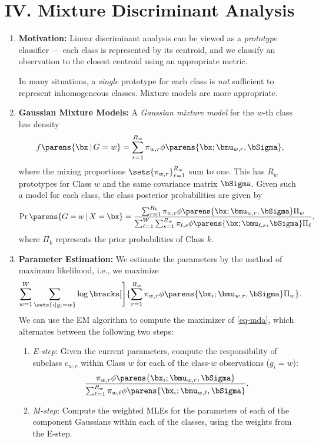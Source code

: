 \documentclass[12pt]{article}
\begin{document}
\section*{IV. Mixture Discriminant Analysis}

\begin{enumerate}[label=\textbf{\arabic*.}]

	\item \textbf{Motivation:} Linear discriminant analysis can be viewed as a \emph{prototype} classifier --- each class is represented by its centroid, and we classify an observation to the closest centroid using an appropriate metric. 
	
	In many situations, a \emph{single} prototype for each class is \emph{not} sufficient to represent inhomogeneous classes. Mixture models are more appropriate. 
	
	\item \textbf{Gaussian Mixture Models:} A \textit{Gaussian mixture model} for the $w$-th class has density 
	\begin{align*}
		f \parens{\bx \,\vert\, G = w} = \sum_{r=1}^{R_w} \pi_{w, r} \phi \parens{\bx; \bmu_{w,r}, \bSigma}, 
	\end{align*}
	where the mixing proportions $\sets{\pi_{w,r}}_{r=1}^{R_w}$ sum to one. This has $R_w$ prototypes for Class $w$ and the same covariance matrix $\bSigma$. Given such a model for each class, the class posterior probabilities are given by 
	\begin{align*}
		\Pr \parens{G = w \,\vert\, X = \bx} = \frac{\sum_{r=1}^{R_k} \pi_{w, r} \phi \parens{\bx; \bmu_{w, r}, \bSigma} \Pi_w}{\sum_{\ell=1}^W \sum_{s=1}^{R_w} \pi_{\ell,s} \phi \parens{\bx; \bmu_{\ell,s}, \bSigma} \Pi_\ell}, 
	\end{align*}
	where $\Pi_k$ represents the prior probabilities of Class $k$. 
	
	\item \textbf{Parameter Estimation:} We estimate the parameters by the method of maximum likelihood, i.e., we maximize 
	\begin{align}\label{eq-mda}
		\sum_{w=1}^W \sum_{\sets{i \vert g_i = w}} \log \bracks[\Bigg]{\sum_{r=1}^{R_w} \pi_{w, r} \phi \parens{\bx_i; \bmu_{w, r}, \bSigma} \Pi_{w}}. 
	\end{align} 
	We can use the EM algorithm to compute the maximizer of \eqref{eq-mda}, which alternates between the following two steps: 
	\begin{enumerate}
		\item \textit{E-step}: Given the current parameters, compute the responsibility of subclass $c_{w,r}$ within Class $w$ for each of the class-$w$ observations ($g_i = w$): 
		\begin{align*}
			\frac{\pi_{w, r} \phi \parens{\bx_i; \bmu_{w, r}, \bSigma}}{\sum_{\ell=1}^{R_w} \pi_{w,\ell} \phi \parens{\bx_i; \bmu_{w,\ell}, \bSigma}}. 
		\end{align*}
		\item \textit{M-step}: Compute the weighted MLEs for the parameters of each of the component Gaussians within each of the classes, using the weights from the E-step. 
	\end{enumerate} 
\end{enumerate}

\printbibliography
\end{document}
